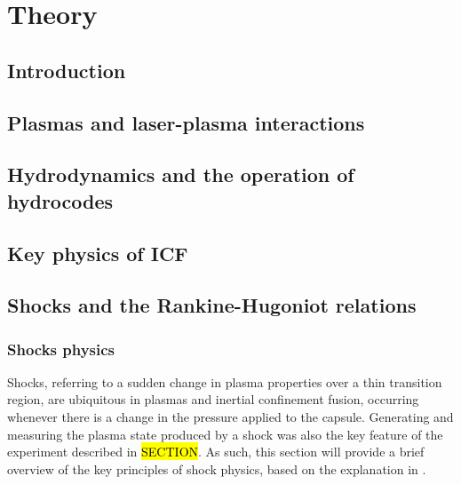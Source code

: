 

\chapter{\label{ch-theory}Theory}

\minitoc

\section{Introduction}

\section{Plasmas and laser-plasma interactions}
\section{Hydrodynamics and the operation of hydrocodes}
\section{Key physics of ICF}
\section{Shocks and the Rankine-Hugoniot relations}

\subsection{Shocks physics}

Shocks, referring to a sudden change in plasma properties over a thin transition region, are ubiquitous in plasmas and inertial confinement fusion, occurring whenever there is a change in the pressure applied to the capsule. Generating and measuring the plasma state produced by a shock was also the key feature of the experiment described in \hl{SECTION}. As such, this section will provide a brief overview of the key principles of shock physics, based on the explanation in \cite{Zeldovich1966}.

